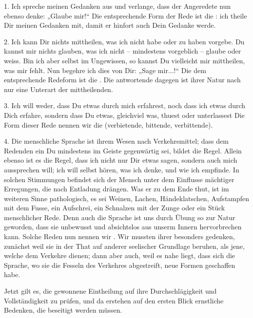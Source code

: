 \label{IV.III.I.1}1. Ich spreche meinen Gedanken aus und verlange, dass der Angeredete nun ebenso denke: „Glaube mir!“ Die entsprechende Form der Rede ist die : ich theile Dir meinen Gedanken mit, damit er hinfort auch Dein Gedanke werde.

\label{IV.III.I.2}2. Ich kann Dir nichts mittheilen, was ich nicht habe oder zu haben vorgebe. Du kannst mir nichts glauben, was ich nicht – mindestens vorgeblich – glaube oder weiss. Bin ich aber selbst im Ungewissen, so kannst Du vielleicht mir mit\-theilen, was mir fehlt. Nun begehre ich dies von Dir: „Sage \label{sp.319} mir...!“ Die dem entsprechende Redeform ist die . Die antwortende dagegen ist ihrer Natur nach nur eine Unterart der mittheilenden.

\label{IV.III.I.3}3. Ich will weder, dass Du etwas durch mich erfahrest, noch dass ich etwas durch Dich erfahre, sondern dass Du etwas, gleichviel was, thuest oder unterlassest Die Form dieser Rede nennen wir die  (verbietende, bittende, verbittende).

\label{IV.III.I.4}4. Die menschliche Sprache ist ihrem Wesen nach Verkehrsmittel; dass dem Redenden ein Du mindestens im Geiste gegenwärtig sei, bildet die Regel. Allein ebenso ist es die Regel, dass ich nicht nur Dir etwas sagen, sondern auch mich aussprechen will; ich will selbst hören, was ich denke, und wie ich empfinde. In solchen Stimmungen befindet sich \label{fp.310} der Mensch unter dem Einflusse mächtiger Erregungen, die nach Entladung drängen. Was er zu dem Ende thut, ist im weiteren Sinne pathologisch, es sei Weinen, Lachen, Händeklatschen, Aufstampfen mit dem Fusse, ein Aufschrei, ein Schnalzen mit der Zunge oder ein Stück menschlicher Rede. Denn auch die Sprache ist uns durch Übung so zur Natur geworden, dass sie unbewusst und absichtslos aus unserm Innern hervorbrechen kann. Solche Reden nun nennen wir . Wir mussten ihrer besonders gedenken, zunächst weil sie in der That auf anderer seelischer Grundlage beruhen, als jene, welche dem Verkehre dienen; dann aber auch, weil es nahe liegt, dass sich die Sprache, wo sie die Fesseln des Verkehres abgestreift, neue Formen geschaffen habe.

\label{IV.III.I.5}Jetzt gilt es, die gewonnene Eintheilung auf ihre Durchschlägigkeit und Vollständigkeit zu prüfen, und da erstehen auf den ersten Blick ernstliche Bedenken, die beseitigt werden müssen.

